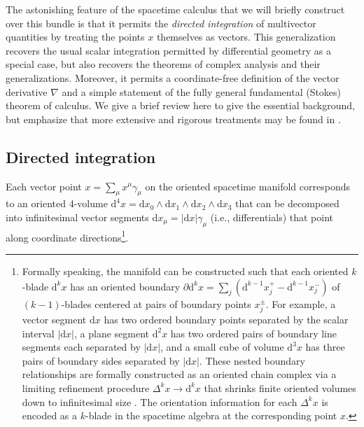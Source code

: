 \documentclass[1p,sort&compress]{elsarticle}
\numberwithin{equation}{section}
\begin{document}
The astonishing feature of the spacetime calculus that we will briefly construct over this bundle is that it permits the \emph{directed integration} of multivector quantities by treating the points $x$ themselves as vectors.  This generalization recovers the usual scalar integration permitted by differential geometry as a special case, but also recovers the theorems of complex analysis and their generalizations.  Moreover, it permits a coordinate-free definition of the vector derivative $\nabla$ and a simple statement of the fully general fundamental (Stokes) theorem of calculus.  We give a brief review here to give the essential background, but emphasize that more extensive and rigorous treatments may be found in \cite{Hestenes1987,Hestenes2005,Doran2007,Hestenes1968,Hestenes1968b,Sobczyk1989}.


\subsection{Directed integration}


Each vector point $x = \sum_\mu x^\mu \gamma_\mu$ on the oriented spacetime manifold corresponds to an oriented 4-volume $\textrm{d}^4\!x = \textrm{d}x_0\wedge\textrm{d}x_1\wedge\textrm{d}x_2\wedge\textrm{d}x_3$ that can be decomposed into infinitesimal vector segments $\textrm{d}x_\mu = |\textrm{d}x|\gamma_\mu$ (i.e., differentials) that point along coordinate directions\footnote{Formally speaking, the manifold can be constructed such that each oriented $k$-blade $\textrm{d}^k\!x$ has an oriented boundary $\partial \textrm{d}^k\!x = \sum_j (\textrm{d}^{k-1}\!x^+_j - \textrm{d}^{k-1}\!x^-_j)$ of $(k-1)$-blades centered at pairs of boundary points $x^\pm_j$.  For example, a vector segment $\textrm{d}x$ has two ordered boundary points separated by the scalar interval $|\textrm{d}x|$, a plane segment $\textrm{d}^2\!x$ has two ordered pairs of boundary line segments each separated by $|\textrm{d}x|$, and a small cube of volume $\textrm{d}^3\!x$ has three pairs of boundary sides separated by $|\textrm{d}x|$.  These nested boundary relationships are formally constructed as an oriented chain complex via a limiting refinement procedure $\Delta^k\! x \to \textrm{d}^k\! x$ that shrinks finite oriented volumes down to infinitesimal size \cite{Sobczyk1989}.  The orientation information for each $\Delta^k\! x$ is encoded as a $k$-blade in the spacetime algebra at the corresponding point $x$.}.
\end{document}
